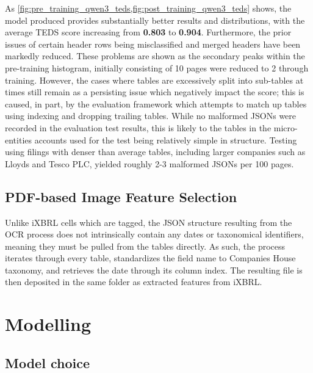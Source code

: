 \documentclass[ %
                    author={Natchalin Iwsakul \\[0.4em] Inkaphol Siriwongwattana \\[0.4em] Tanaphan Kummaraphat \\[0.6em] Patorn Srisupap},,
                supervisor={Fernando Moreno-Pino},
                    degree={MSc},
                     title={Propensity Modelling for SME Commercial Lending Using Open Public Data
},
                  subtitle={Companies House and GDELT as predictors of first-time borrowing},
                      type={},
                      year={2026}]{dissertation}
\begin{document}
    As \cref{fig:pre_training_qwen3_teds,fig:post_training_qwen3_teds} shows, the model produced provides substantially better results and distributions, with the average TEDS score increasing from \textbf{0.803} to \textbf{0.904}. Furthermore, the prior issues of certain header rows being misclassified and merged headers have been markedly reduced. These problems are shown as the secondary peaks within the pre-training histogram, initially consisting of 10 pages were reduced to 2 through training. However, the cases where tables are excessively split into sub-tables at times still remain as a persisting issue which negatively impact the score; this is caused, in part, by the evaluation framework which attempts to match up tables using indexing and dropping trailing tables.
    While no malformed JSONs were recorded in the evaluation test results, this is likely to the tables in the micro-entities accounts used for the test being relatively simple in structure. Testing using filings with denser than average tables, including larger companies such as Lloyds and Tesco PLC, yielded roughly 2-3 malformed JSONs per 100 pages. 



    
\subsection{PDF-based Image Feature Selection}
Unlike iXBRL cells which are tagged, the JSON structure resulting from the OCR process does not intrinsically contain any dates or taxonomical identifiers, meaning they must be pulled from the tables directly. As such, the process iterates through every table, standardizes the field name to Companies House taxonomy, and retrieves the date through its column index. The resulting file is then deposited in the same folder as extracted features from iXBRL.

\section{Modelling}                            
\label{sec:model}

  \subsection{Model choice}


  
\end{document}
